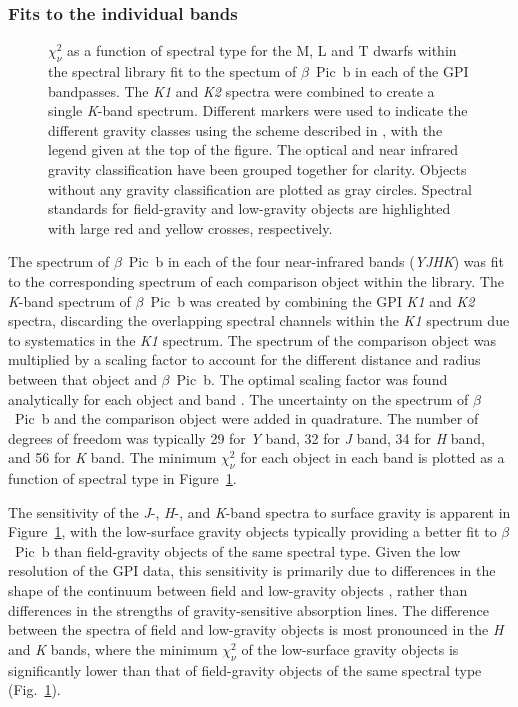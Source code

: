 \documentclass[twocolumn]{aastex6}
\begin{document}
\subsubsection{Fits to the individual bands}
\begin{figure}
\caption{$\chi^2_{\nu}$ as a function of spectral type for the M, L and T dwarfs within the spectral library fit to the spectum of $\beta$~Pic~b in each of the GPI bandpasses. The {\it K1} and {\it K2} spectra were combined to create a single {\it K}-band spectrum. Different markers were used to indicate the different gravity classes using the scheme described in \citet{Allers2013}, with the legend given at the top of the figure. The optical and near infrared gravity classification have been grouped together for clarity. Objects without any gravity classification are plotted as gray circles. Spectral standards for field-gravity \citep{Burgasser:2006cf,Kirkpatrick:2010dc} and low-gravity \citep{Allers2013} objects are highlighted with large red and yellow crosses, respectively.}
\label{chi2a}
\end{figure}
The spectrum of $\beta$~Pic~b in each of the four near-infrared bands ({\it YJHK}) was fit to the corresponding spectrum of each comparison object within the library. The {\it K}-band spectrum of $\beta$~Pic~b was created by combining the GPI {\it K1} and {\it K2} spectra, discarding the overlapping spectral channels within the {\it K1} spectrum due to systematics in the {\it K1} spectrum. The spectrum of the comparison object was multiplied by a scaling factor to account for the different distance and radius between that object and $\beta$~Pic~b. The optimal scaling factor was found analytically for each object and band \citep[e.g.,][]{2016ApJ...820...32B}. The uncertainty on the spectrum of $\beta$~Pic~b and the comparison object were added in quadrature. The number of degrees of freedom was typically 29 for {\it Y} band, 32 for {\it J} band, 34 for {\it H} band, and 56 for {\it K} band. The minimum $\chi^2_{\nu}$ for each object in each band is plotted as a function of spectral type in Figure~\ref{chi2a}.

The sensitivity of the {\it J}-, {\it H}-, and {\it K}-band spectra to surface gravity is apparent in Figure~\ref{chi2a}, with the low-surface gravity objects typically providing a better fit to $\beta$~Pic~b than field-gravity objects of the same spectral type. Given the low resolution of the GPI data, this sensitivity is primarily due to differences in the shape of the continuum between field and low-gravity objects \citep{Allers2013}, rather than differences in the strengths of gravity-sensitive absorption lines. The difference between the spectra of field and low-gravity objects is most pronounced in the {\it H} and {\it K} bands, where the minimum $\chi^2_{\nu}$ of the low-surface gravity objects is significantly lower than that of field-gravity objects of the same spectral type (Fig.~\ref{chi2a}).
\end{document}
